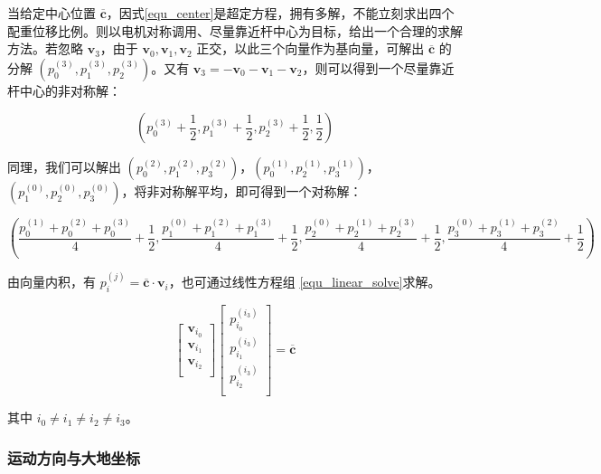 \documentclass[a4paper]{ctexart}
\numberwithin{equation}{section}
\numberwithin{table}{section}
\numberwithin{figure}{section}
\begin{document}
当给定中心位置 $\overline{\boldsymbol c}$，因式\ref{equ_center}是超定方程，拥有多解，不能立刻求出四个配重位移比例。则以电机对称调用、尽量靠近杆中心为目标，给出一个合理的求解方法。若忽略 $\boldsymbol v_3$，由于 $\boldsymbol v_0,\boldsymbol v_1,\boldsymbol v_2$ 正交，以此三个向量作为基向量，可解出 $\overline{\boldsymbol c}$ 的分解 $\left(p_0^{(3)},p_1^{(3)},p_2^{(3)}\right)$。又有 $\boldsymbol v_3 = - \boldsymbol v_0 -\boldsymbol v_1-\boldsymbol v_2$，则可以得到一个尽量靠近杆中心的非对称解：

\begin{equation}
  \left(p_0^{(3)} +\frac{1}{2}, p_1^{(3)} +\frac{1}{2}, p_2^{(3)} + \frac{1}{2}, \frac{1}{2}\right)
\end{equation}

同理，我们可以解出 $\left(p_0^{(2)},p_1^{(2)},p_3^{(2)}\right)$，$\left(p_0^{(1)},p_2^{(1)},p_3^{(1)}\right)$，$\left(p_1^{(0)},p_2^{(0)},p_3^{(0)}\right)$，将非对称解平均，即可得到一个对称解：

\begin{equation}
  \left(
    \frac{p_0^{(1)}+p_0^{(2)}+p_0^{(3)}}{4} +\frac{1}{2},
    \frac{p_1^{(0)}+p_1^{(2)}+p_1^{(3)}}{4} +\frac{1}{2},
    \frac{p_2^{(0)}+p_2^{(1)}+p_2^{(3)}}{4} +\frac{1}{2},
    \frac{p_3^{(0)}+p_3^{(1)}+p_3^{(2)}}{4} +\frac{1}{2}
  \right)
\end{equation}

由向量内积，有 $p_i^{(j)} = \overline{\boldsymbol c} \cdot \boldsymbol v_i$，也可通过线性方程组
\ref{equ_linear_solve}求解。

\begin{equation}
  \begin{bmatrix}
    \boldsymbol v_{i_0} \\
    \boldsymbol v_{i_1} \\
    \boldsymbol v_{i_2} \\
  \end{bmatrix}
  \begin{bmatrix}
    p_{i_0}^{(i_3)} \\
    p_{i_1}^{(i_3)} \\
    p_{i_2}^{(i_3)} \\
  \end{bmatrix}
  =
  \overline{\boldsymbol c}
  \label{equ_linear_solve}
\end{equation}

其中 $i_0\neq i_1\neq i_2\neq i_3$。


\subsubsection{运动方向与大地坐标}
\end{document}
